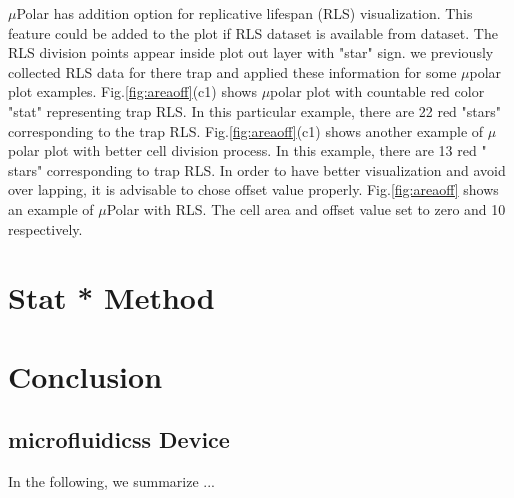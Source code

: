 \documentclass[conference]{IEEEtran}
\begin{document}
$\mu$Polar has addition option for replicative lifespan (RLS) visualization. This feature could be added to the plot if RLS dataset is available from dataset. The RLS division points appear inside plot out layer with "star" sign. we previously collected RLS data for there trap and applied these information for some $\mu$polar plot examples. Fig.\ref{fig:areaoff}(c1) shows $\mu$polar plot with countable red color "stat" representing  trap RLS. In this particular example, there are 22 red "stars" corresponding to the trap RLS. Fig.\ref{fig:areaoff}(c1) shows another  example of $\mu$polar plot with better cell division process. In this example, there are 13 red " stars" corresponding  to trap RLS.  
In order to have better visualization and avoid over lapping, it is advisable to chose offset value properly. Fig.\ref{fig:areaoff} shows an example of $\mu$Polar with RLS. The cell area and offset value set to zero and 10 respectively.        



\section{Stat * Method}






\section{Conclusion}



\subsection{microfluidicss Device}
In the following, we summarize ... 
 
\end{document}
